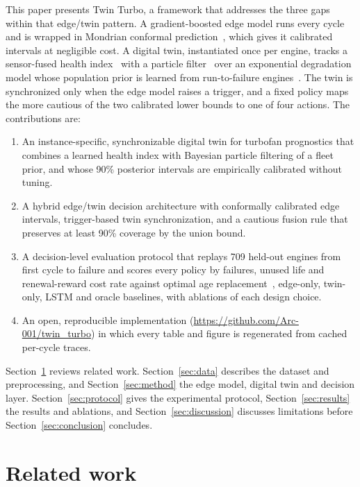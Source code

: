 \documentclass[pdflatex,sn-mathphys-num]{sn-jnl}
\gdef\repourl{\url{https://github.com/Arc-001/twin_turbo}}
\begin{document}
This paper presents Twin Turbo, a framework that addresses the three gaps within that edge/twin pattern. A gradient-boosted edge model runs every cycle and is wrapped in Mondrian conformal prediction~\cite{vovk2005alrw,angelopoulos2021gentle}, which gives it calibrated intervals at negligible cost. A digital twin, instantiated once per engine, tracks a sensor-fused health index~\cite{wang2008similarity} with a particle filter~\cite{arulampalam2002tutorial,orchard2009particle} over an exponential degradation model whose population prior is learned from run-to-failure engines~\cite{gebraeel2005residual}. The twin is synchronized only when the edge model raises a trigger, and a fixed policy maps the more cautious of the two calibrated lower bounds to one of four actions. The contributions are:
\begin{enumerate}
\item An instance-specific, synchronizable digital twin for turbofan prognostics that combines a learned health index with Bayesian particle filtering of a fleet prior, and whose 90\% posterior intervals are empirically calibrated without tuning.
\item A hybrid edge/twin decision architecture with conformally calibrated edge intervals, trigger-based twin synchronization, and a cautious fusion rule that preserves at least 90\% coverage by the union bound.
\item A decision-level evaluation protocol that replays 709 held-out engines from first cycle to failure and scores every policy by failures, unused life and renewal-reward cost rate against optimal age replacement~\cite{barlow1960optimum}, edge-only, twin-only, LSTM and oracle baselines, with ablations of each design choice.
\item An open, reproducible implementation (\repourl) in which every table and figure is regenerated from cached per-cycle traces.
\end{enumerate}

Section~\ref{sec:related} reviews related work. Section~\ref{sec:data} describes the dataset and preprocessing, and Section~\ref{sec:method} the edge model, digital twin and decision layer. Section~\ref{sec:protocol} gives the experimental protocol, Section~\ref{sec:results} the results and ablations, and Section~\ref{sec:discussion} discusses limitations before Section~\ref{sec:conclusion} concludes.

\section{Related work}\label{sec:related}
\end{document}
